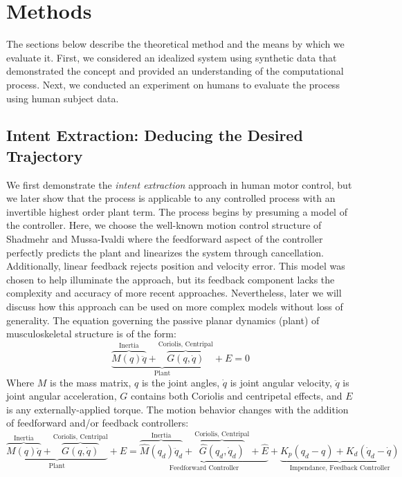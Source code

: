 \section*{Methods}
The sections below describe the theoretical method and the means by which we evaluate it. First, we considered an idealized system using synthetic data that demonstrated the concept and provided an understanding of the computational process. Next, we conducted an experiment on humans to evaluate the process using human subject data. 

\subsection*{Intent Extraction: Deducing the Desired Trajectory}
We first demonstrate the \textit{intent extraction} approach in human motor control, but we later show that the process is applicable to any controlled process with an invertible highest order plant term. The process begins by presuming a model of the controller. Here, we choose the well-known motion control structure of Shadmehr and Mussa-Ivaldi\cite{shadmehr1994adaptive} where the feedforward aspect of the controller perfectly predicts the plant and linearizes the system through cancellation. Additionally, linear feedback rejects position and velocity error. This model was chosen to help illuminate the approach, but its feedback component lacks the complexity and accuracy of more recent approaches. Nevertheless, later we will discuss how this approach can be used on more complex models without loss of generality. The equation governing the passive planar dynamics (plant) of musculoskeletal structure is of the form:
\begin{equation}
\underbrace{\overbrace{M(q)\ddot{q}}^{\text{Inertia}}+\overbrace{G(q,\dot{q})}^{\text{Coriolis, Centripal}}}_{\text{Plant}}+E=0
\end{equation}
Where $M$ is the mass matrix, $q$ is the joint angles, $\dot{q}$ is joint angular velocity, $\ddot{q}$ is joint angular acceleration, $G$ contains both Coriolis and centripetal effects, and $E$ is any externally-applied torque. The motion behavior changes with the addition of feedforward and/or feedback controllers:
\begin{equation}
\underbrace{\overbrace{M(q)\ddot{q}}^{\text{Inertia}}+\overbrace{G(q,\dot{q})}^{\text{Coriolis, Centripal}}}_{\text{Plant}}+E=\underbrace{\overbrace{\hat{M}(q_d)\ddot{q}_d}^{\text{Inertia}}+\overbrace{\hat{G}(q_d,\dot{q}_d)}^{\text{Coriolis, Centripal}}+\hat{E}}_{\text{Feedforward Controller}}+\underbrace{K_p(q_d-q)+K_d(\dot{q}_d-\dot{q})}_{\text{Impendance, Feedback Controller}}
\end{equation}
